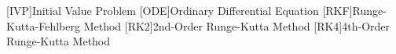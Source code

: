
\begin{acronym}
	
	[IVP]{Initial Value Problem}
	[ODE]{Ordinary Differential Equation}
	[RKF]{Runge-Kutta-Fehlberg Method}
	[RK2]{2nd-Order Runge-Kutta Method}
	[RK4]{4th-Order Runge-Kutta Method}

\end{acronym}
